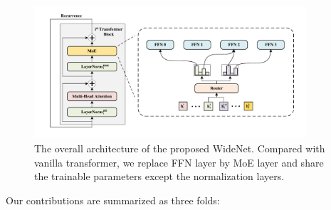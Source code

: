 \documentclass[letterpaper]{article} %
\begin{document}
\begin{figure}[t]
\centering
\includegraphics[width=0.9\textwidth]{Overview.pdf}
\caption{The overall architecture of the proposed WideNet. Compared with vanilla transformer, we replace FFN layer by MoE layer and share the trainable parameters except the normalization layers.}
\label{fig:overview}
\end{figure}

Our contributions are summarized as three folds:
\end{document}
